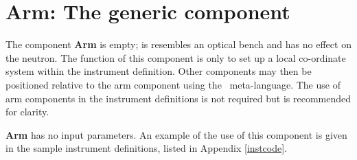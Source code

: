 \section{Arm: The generic component}
\label{explain:arm}

The component {\bf Arm} is empty; is resembles an optical bench
and has no effect on the neutron.
The function of this component is only to set up a local 
co-ordinate system within the instrument definition. 
Other components may then be
positioned relative to the arm component
using the \MCS\ meta-language.
The use of arm components in the instrument definitions
is not required but is recommended for clarity.

{\bf Arm} has no input parameters.
An example of the use of this component is given in the 
sample instrument definitions, listed in Appendix \ref{instcode}.

